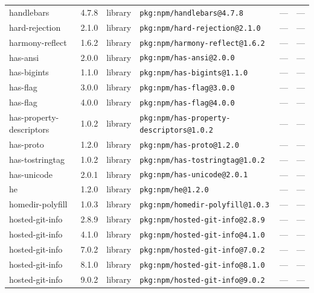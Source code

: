 \documentclass[11pt,a4paper]{article}
\begin{document}
\begin{longtable}{|p{4cm}|p{2cm}|p{1.6cm}|p{5cm}|p{1.5cm}|p{3.5cm}|}
\raggedright handlebars & 4.7.8 & library & \small\texttt{pkg:npm/handlebars@4.7.8} & — & \small — \\
\raggedright hard-rejection & 2.1.0 & library & \small\texttt{pkg:npm/hard-rejection@2.1.0} & — & \small — \\
\raggedright harmony-reflect & 1.6.2 & library & \small\texttt{pkg:npm/harmony-reflect@1.6.2} & — & \small — \\
\raggedright has-ansi & 2.0.0 & library & \small\texttt{pkg:npm/has-ansi@2.0.0} & — & \small — \\
\raggedright has-bigints & 1.1.0 & library & \small\texttt{pkg:npm/has-bigints@1.1.0} & — & \small — \\
\raggedright has-flag & 3.0.0 & library & \small\texttt{pkg:npm/has-flag@3.0.0} & — & \small — \\
\raggedright has-flag & 4.0.0 & library & \small\texttt{pkg:npm/has-flag@4.0.0} & — & \small — \\
\raggedright has-property-descriptors & 1.0.2 & library & \small\texttt{pkg:npm/has-property-descriptors@1.0.2} & — & \small — \\
\raggedright has-proto & 1.2.0 & library & \small\texttt{pkg:npm/has-proto@1.2.0} & — & \small — \\
\raggedright has-tostringtag & 1.0.2 & library & \small\texttt{pkg:npm/has-tostringtag@1.0.2} & — & \small — \\
\raggedright has-unicode & 2.0.1 & library & \small\texttt{pkg:npm/has-unicode@2.0.1} & — & \small — \\
\raggedright he & 1.2.0 & library & \small\texttt{pkg:npm/he@1.2.0} & — & \small — \\
\raggedright homedir-polyfill & 1.0.3 & library & \small\texttt{pkg:npm/homedir-polyfill@1.0.3} & — & \small — \\
\raggedright hosted-git-info & 2.8.9 & library & \small\texttt{pkg:npm/hosted-git-info@2.8.9} & — & \small — \\
\raggedright hosted-git-info & 4.1.0 & library & \small\texttt{pkg:npm/hosted-git-info@4.1.0} & — & \small — \\
\raggedright hosted-git-info & 7.0.2 & library & \small\texttt{pkg:npm/hosted-git-info@7.0.2} & — & \small — \\
\raggedright hosted-git-info & 8.1.0 & library & \small\texttt{pkg:npm/hosted-git-info@8.1.0} & — & \small — \\
\raggedright hosted-git-info & 9.0.2 & library & \small\texttt{pkg:npm/hosted-git-info@9.0.2} & — & \small — \\

\end{longtable}
\end{document}

